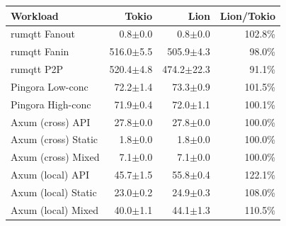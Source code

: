 \begin{tabular}{@{}l r r r@{}}
\toprule
Workload & Tokio & Lion & Lion/Tokio \\
\midrule
rumqtt Fanout & 0.8$\pm$0.0 & 0.8$\pm$0.0 & 102.8\% \\
rumqtt Fanin & 516.0$\pm$5.5 & 505.9$\pm$4.3 & 98.0\% \\
rumqtt P2P & 520.4$\pm$4.8 & 474.2$\pm$22.3 & 91.1\% \\
Pingora Low-conc & 72.2$\pm$1.4 & 73.3$\pm$0.9 & 101.5\% \\
Pingora High-conc & 71.9$\pm$0.4 & 72.0$\pm$1.1 & 100.1\% \\
Axum (cross) API & 27.8$\pm$0.0 & 27.8$\pm$0.0 & 100.0\% \\
Axum (cross) Static & 1.8$\pm$0.0 & 1.8$\pm$0.0 & 100.0\% \\
Axum (cross) Mixed & 7.1$\pm$0.0 & 7.1$\pm$0.0 & 100.0\% \\
Axum (local) API & 45.7$\pm$1.5 & 55.8$\pm$0.4 & 122.1\% \\
Axum (local) Static & 23.0$\pm$0.2 & 24.9$\pm$0.3 & 108.0\% \\
Axum (local) Mixed & 40.0$\pm$1.1 & 44.1$\pm$1.3 & 110.5\% \\
\bottomrule
\end{tabular}
